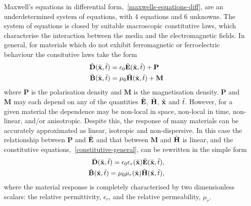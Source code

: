 Maxwell's equations in differential form,~\eqref{maxwells-equations-diff}, are an underdetermined system of equations, with 4 equations and 6 unknowns. The system of equations is closed by suitable macroscopic constitutive laws, which characterise the interaction between the media and the electromagnetic fields. In general, for materials which do not exhibit ferromagnetic or ferroelectric behaviour the consitutive laws take the form
\begin{subequations}
    \label{constitutive-general}
    \begin{align}
        \tilde{\mathbf{D}}(\tilde{\mathbf{x}},\tilde{t}) &= \epsilon_0 \tilde{\mathbf{E}}(\tilde{\mathbf{x}},\tilde{t}) + \mathbf{P} \label{constitutive-general-E} \\
        \tilde{\mathbf{B}}(\tilde{\mathbf{x}},\tilde{t}) &= \mu_0 \tilde{\mathbf{H}}(\tilde{\mathbf{x}},\tilde{t}) + \mathbf{M}
    \end{align}
\end{subequations}
where $\mathbf{P}$ is the polarisation density and $\mathbf{M}$ is the magnetisation density. $\mathbf{P}$ and $\mathbf{M}$ may each depend on any of the quantities $\tilde{\mathbf{E}}$, $\tilde{\mathbf{H}}$, $\tilde{\mathbf{x}}$ and $\tilde{t}$. However, for a given material the dependence may be non-local in space, non-local in time, non-linear, and/or anisotropic. Despite this, the response of many materials can be accurately approximated as linear, isotropic and non-dispersive. In this case the relationship between $\mathbf{P}$ and $\tilde{\mathbf{E}}$ and that between $\mathbf{M}$ and $\tilde{\mathbf{H}}$ is linear, and the constitutive equations,~\eqref{constitutive-general}, can be rewritten in the simple form
\begin{subequations}
    \label{constitutive-linear}
    \begin{align}
        \tilde{\mathbf{D}}(\tilde{\mathbf{x}},\tilde{t}) = \epsilon_0 \epsilon_r(\tilde{\mathbf{x}}) \tilde{\mathbf{E}}(\tilde{\mathbf{x}},\tilde{t}), \label{constitutive-linear-D} \\
        \tilde{\mathbf{B}}(\tilde{\mathbf{x}},\tilde{t}) = \mu_0 \mu_r(\tilde{\mathbf{x}}) \tilde{\mathbf{H}}(\tilde{\mathbf{x}},\tilde{t}),
    \end{align}
\end{subequations}
where the material response is completely characterised by two dimensionless scalars: the relative permittivity, $\epsilon_r$, and the relative permeability, $\mu_r$.

